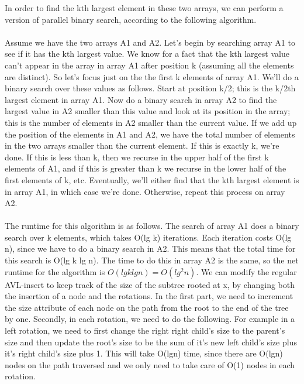 \documentclass[12pt,twoside]{article}
\begin{document}
\begin{problems}
\problem  %

\begin{problemparts}
\problempart
In order to find the kth largest element in these two arrays, we can perform a version of parallel binary search, according to the following algorithm.
\\\\
Assume we have the two arrays A1 and A2.  Let's begin by searching array A1 to see if it has the kth largest value. We know for a fact that the kth largest value can't appear in the array in array A1 after position k (assuming all the elements are distinct). So let's focus just on the the first k elements of array A1. We'll do a binary search over these values as follows. Start at position k/2; this is the k/2th largest element in array A1. Now do a binary search in array A2 to find the largest value in A2 smaller than this value and look at its position in the array; this is the number of elements in A2 smaller than the current value. If we add up the position of the elements in A1 and A2, we have the total number of elements in the two arrays smaller than the current element. If this is exactly k, we're done. If this is less than k, then we recurse in the upper half of the first k elements of A1, and if this is greater than k we recurse in the lower half of the first elements of k, etc. Eventually, we'll either find that the kth largest element is in array A1, in which case we're done. Otherwise, repeat this process on array A2.
\\\\
The runtime for this algorithm is as follows. The search of array A1 does a binary search over k elements, which takes O(lg k) iterations. Each iteration costs O(lg n), since we have to do a binary search in A2. This means that the total time for this search is O(lg k lg n). The time to do this in array A2 is the same, so the net runtime for the algorithm is $O(lg k lg n) = O(lg^2 n)$.
\problempart 
We can modify the regular AVL-insert to keep track of the size of the subtree rooted at x, by changing both the insertion of a node and the rotations. In the first part, we need to increment the size attribute of each node on the path from the root to the end of the tree by one. Secondly, in each rotation, we need to do the following. For example in a left rotation, we need to first change the right right child's size to the parent's size and then update the root's size to be the sum of it's new left child's size plus it's right child's size plus 1. This will take O(lgn) time, since there are O(lgn) nodes on the path traversed and we only need to take care of O(1) nodes in each rotation.


\end{problemparts}
\end{problems}
\end{document}
